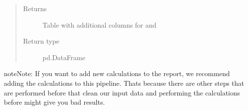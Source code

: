 \documentclass[letterpaper,10pt,english]{sphinxmanual}
\begin{document}
\begin{fulllineitems}
\begin{quote}
\begin{description}
\item[{Returns}] \leavevmode
{} \textendash{} Table with additional columns for  and 

\item[{Return type}] \leavevmode
pd.DataFrame

\end{description}\end{quote}

\begin{sphinxadmonition}{note}{Note:}
If you want to add new calculations to the report, we recommend adding the calculations to this pipeline.
Thats because there are other steps that are performed before that clean our input data and performing the calculations
before might give you bad results.
\end{sphinxadmonition}

\end{fulllineitems}

\end{document}
